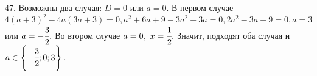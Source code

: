 47. Возможны два случая: $D=0$ или $a=0.$ В первом случае $4(a+3)^2-4a(3a+3)=0, a^2+6a+9-3a^2-3a=0, 2a^2-3a-9=0, a=3$ или $a=-\cfrac{3}{2}.$ Во втором случае $a=0,\ x=\cfrac{1}{2}.$ Значит, подходят оба случая и $a\in\left\{-\cfrac{3}{2}; 0; 3\right\}.$\\
